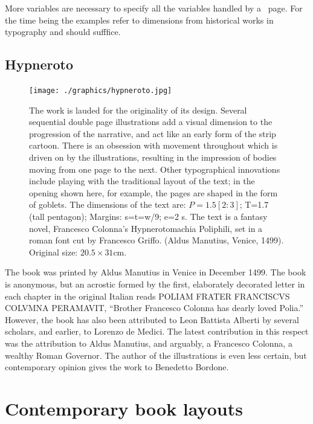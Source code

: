 More variables are necessary to specify all the variables handled by a \latex\
page. For the time being the examples refer to dimensions from historical works
in typography and should sufffice.

\subsection{Hypneroto}

\begin{figure}[htbp]
\centering
  \texttt{[image: ./graphics/hypneroto.jpg]}
\caption{The work is lauded for the originality of its
design. Several sequential double page
illustrations add a visual dimension to the
progression of the narrative, and act like an
early form of the strip cartoon. There is an
obsession with movement throughout which is driven
on by the illustrations, resulting in the
impression of bodies moving from one page to the
next. Other typographical innovations include
playing with the traditional layout of the text;
in the opening shown here, for example, the pages
are shaped in the form of goblets. The dimensions
of the text are: $P=1.5[2:3]$; T=1.7 (tall pentagon);
Margins: s=t=w/9; e=2 s. The text is a fantasy
novel, Francesco Colonna's Hypnerotomachia
Poliphili, set in a roman font cut by Francesco
Griffo. (Aldus Manutius, Venice, 1499). Original
size: $20.5\times31$\thinspace cm.}
\label{fig:hypneroto}
\end{figure}





The book was printed by Aldus Manutius in Venice in December 1499. The book is anonymous, but an acrostic formed by the first, elaborately decorated letter in each chapter in the original Italian reads \textsc{\small POLIAM FRATER FRANCISCVS COLVMNA PERAMAVIT}, \enquote{Brother Francesco Colonna has dearly loved Polia.} However, the book has also been attributed to Leon Battista Alberti by several scholars, and earlier, to Lorenzo de Medici. The latest contribution in this respect was the attribution to Aldus Manutius, and arguably, a Francesco Colonna, a wealthy Roman Governor. The author of the illustrations is even less certain, but contemporary opinion gives the work to Benedetto Bordone.

\section{Contemporary book layouts}


